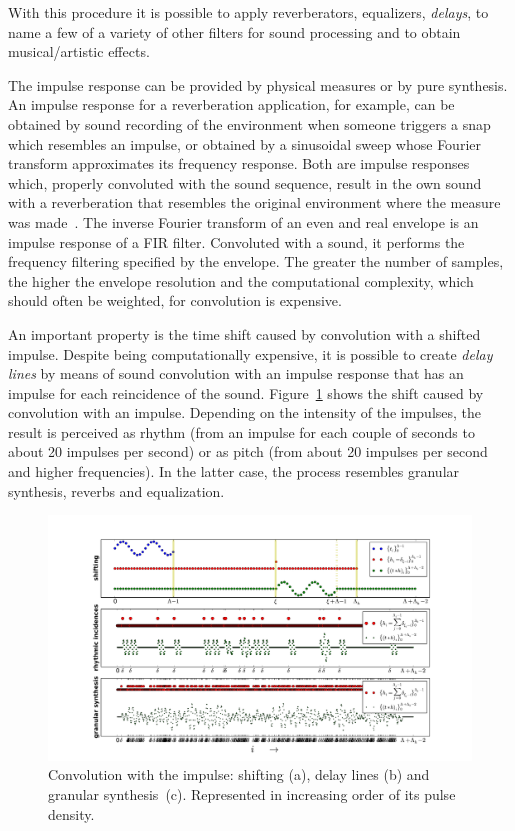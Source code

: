 With this procedure it is possible to apply reverberators, equalizers, \emph{delays}, to name a few of a variety of other filters for sound processing and to obtain musical/artistic effects.

The impulse response can be provided by physical measures or by pure synthesis. An impulse response for a reverberation application, for example, can be obtained by sound recording of the environment when someone triggers a snap which resembles an impulse, or obtained by a sinusoidal sweep whose Fourier transform approximates its frequency response. Both are impulse responses which, properly convoluted with the sound sequence, result in the own sound with a reverberation that resembles the original environment where the measure was made~\cite{Cook}. The inverse Fourier transform of an even and real envelope is an impulse response of a FIR filter. Convoluted with a sound, it performs the frequency filtering specified by the envelope. The greater the number of samples, the higher the envelope resolution and the computational complexity, which should often be weighted, for convolution is expensive.

An important property is the time shift caused by convolution with a shifted impulse. Despite being computationally expensive, it is possible to create \emph{delay lines} by means of sound convolution with an impulse response that has an impulse for each reincidence of the sound. Figure~\ref{fig:delays} shows the shift caused by convolution with an impulse. Depending on the intensity of the impulses, the result is perceived as rhythm (from an impulse for each couple of seconds to about 20 impulses per second) or as pitch (from about 20 impulses per second and higher frequencies). In the latter case, the process resembles granular synthesis, reverbs and equalization.

\begin{figure}
    \centering
        \includegraphics[width=\textwidth]{figures/delays}
    \caption{Convolution with the impulse: shifting (a), delay lines (b) and granular synthesis~(c). Represented in increasing order of its pulse density.}
        \label{fig:delays}
\end{figure}

